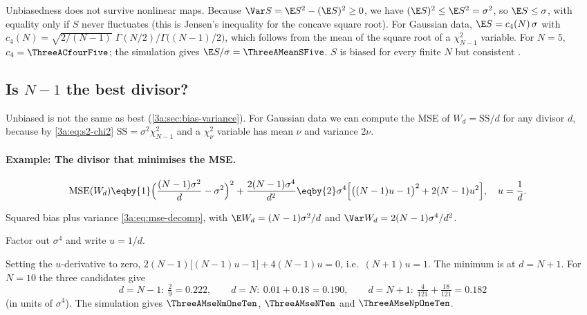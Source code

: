 \begin{pitfall}
Unbiasedness does not survive nonlinear maps. Because
$\Var S=\E S^2-(\E S)^2\ge0$, we have $(\E S)^2\le\E S^2=\sigma^2$, so
$\E S\le\sigma$, with equality only if $S$ never fluctuates (this is
Jensen's inequality for the concave square root). For Gaussian data,
$\E S=c_4(N)\,\sigma$ with
$c_4(N)=\sqrt{2/(N-1)}\;\Gamma(N/2)/\Gamma\bigl((N-1)/2\bigr)$, which follows
from the mean of the square root of a $\chi^2_{N-1}$ variable. For $N=5$,
$c_4=\ThreeACfourFive$; the simulation gives $\E S/\sigma=\ThreeAMeanSFive$.
$S$ is biased for every finite $N$ but consistent
.
\end{pitfall}

\subsection{Is $N-1$ the best divisor?}
\label{3a:sec:best-divisor}

Unbiased is not the same as best (\cref{3a:sec:bias-variance}). For
Gaussian data we can compute the MSE of $W_d=\mathrm{SS}/d$ for any divisor
$d$, because by \eqref{3a:eq:s2-chi2} $\mathrm{SS}=\sigma^2\chi^2_{N-1}$ and
a $\chi^2_\nu$ variable has mean $\nu$ and variance $2\nu$.

\paragraph{Example: The divisor that minimises the MSE.}
\label{3a:ex:divisor}
\begin{align*}
  \operatorname{MSE}(W_d)
  &\eqby{1} \Bigl(\frac{(N-1)\sigma^2}{d}-\sigma^2\Bigr)^2+\frac{2(N-1)\sigma^4}{d^2}
   \eqby{2} \sigma^4\Bigl[\bigl((N-1)u-1\bigr)^2+2(N-1)u^2\Bigr],\quad u=\frac1d .
\end{align*}
\begin{explain}
  \item Squared bias plus variance \eqref{3a:eq:mse-decomp}, with $\E W_d=(N-1)\sigma^2/d$ and $\Var W_d=2(N-1)\sigma^4/d^2$.
  \item Factor out $\sigma^4$ and write $u=1/d$.
\end{explain}
Setting the $u$-derivative to zero,
$2(N-1)\bigl[(N-1)u-1\bigr]+4(N-1)u=0$, i.e.\ $(N+1)u=1$. The minimum is at
$d=N+1$. For $N=10$ the three candidates give
\[
  d=N-1:\ \tfrac29=0.222,\qquad d=N:\ 0.01+0.18=0.190,\qquad
  d=N+1:\ \tfrac{4}{121}+\tfrac{18}{121}=0.182
\]
(in units of $\sigma^4$). The simulation gives $\ThreeAMseNmOneTen$,
$\ThreeAMseNTen$ and $\ThreeAMseNpOneTen$.


